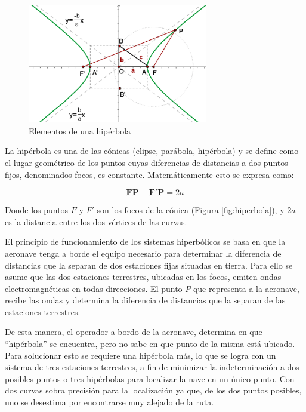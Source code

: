 \begin{figure}[!h]
  \centering
\includegraphics[width=0.7\textwidth]{06.radionavegacion/Imagenes/06.01.adf/Hiperbola.gif}
  \caption{Elementos de una hip\'erbola}
  \label{fig:hiperbola}
  \label{!h}
\end{figure}


La hip\'erbola es una de las c\'onicas (elipse, par\'abola, hip\'erbola) y se define como el lugar geom\'etrico de los puntos cuyas diferencias de distancias a dos puntos fijos, denominados focos, es constante. Matem\'aticamente esto se expresa como:

\[\mathbf{FP}-\mathbf{F'P}= 2a
\]

Donde los puntos $F$ y $F'$ son los focos de la c\'onica (Figura \ref{fig:hiperbola}), y $2a$ es la distancia entre los dos v\'ertices de las curvas.

El principio de funcionamiento de los sistemas hiperb\'olicos se basa en que la aeronave tenga a borde el equipo necesario para determinar la diferencia de distancias que la separan de dos estaciones fijas situadas en tierra. Para ello se asume que las dos estaciones terrestres, ubicadas en los focos, emiten ondas electromagn\'eticas en todas direcciones. El punto $P$ que representa a la aeronave, recibe las ondas y determina la diferencia de distancias que la separan de las estaciones terrestres.

De esta manera, el operador a bordo de la aeronave, determina en que ``hip\'erbola'' se encuentra, pero no sabe en que punto de la misma est\'a ubicado. 
Para solucionar esto se requiere una hip\'erbola m\'as, lo que se logra
con un sistema de tres estaciones terrestres, 
a fin de minimizar la indeterminaci\'on a dos posibles puntos 
o tres hip\'erbolas para localizar la nave en un \'unico punto. 
Con dos curvas sobra precisi\'on para la localizaci\'on ya que, 
de los dos puntos posibles, uno se desestima por encontrarse muy alejado de la ruta.

